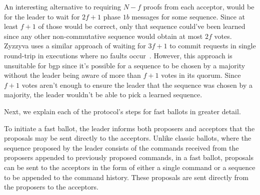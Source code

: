 {An interesting alternative to requiring $N-f$ proofs from each acceptor, would be for the leader to wait for $2f+1$ phase $1b$ messages for some sequence. Since at least $f+1$ of those would be correct, only that sequence could've been learned since any other non-commutative sequence would obtain at most $2f$ votes. Zyzzyva uses a similar approach of waiting for $3f+1$ to commit requests in single round-trip in executions where no faults occur~\cite{Kotla:2008}. However, this approach is unsuitable for \acrshort{bgp} since it's possible for a sequence to be chosen by a majority without the leader being aware of more than $f+1$ votes in its quorum. Since $f+1$ votes aren't enough to ensure the leader that the sequence was chosen by a majority, the leader wouldn't be able to pick a learned sequence.}\par
Next, we explain each of the protocol's steps for fast ballots in greater detail.

To initiate a fast ballot, the leader informs both proposers and acceptors that the proposals may be sent directly to the acceptors. Unlike classic ballots, where the sequence proposed by the leader consists of the commands received from the proposers appended to previously proposed commands, in a fast ballot, proposals can be sent to the acceptors in the form of either a single command or a sequence to be appended to the command history. These proposals are sent directly from the proposers to the acceptors.\par

